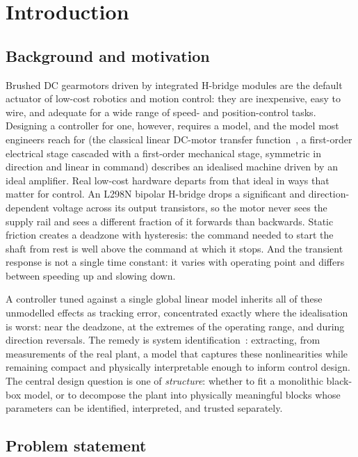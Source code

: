 \chapter{Introduction}
\label{chap:intro}

\section{Background and motivation}

Brushed DC gearmotors driven by integrated H-bridge modules are the default actuator of low-cost robotics and motion control: they are inexpensive, easy to wire, and adequate for a wide range of speed- and position-control tasks. Designing a controller for one, however, requires a model, and the model most engineers reach for (the classical linear DC-motor transfer function~\citep{franklin2019}, a first-order electrical stage cascaded with a first-order mechanical stage, symmetric in direction and linear in command) describes an idealised machine driven by an ideal amplifier. Real low-cost hardware departs from that ideal in ways that matter for control. An L298N bipolar H-bridge drops a significant and direction-dependent voltage across its output transistors, so the motor never sees the supply rail and sees a different fraction of it forwards than backwards. Static friction creates a deadzone with hysteresis: the command needed to start the shaft from rest is well above the command at which it stops. And the transient response is not a single time constant: it varies with operating point and differs between speeding up and slowing down.

A controller tuned against a single global linear model inherits all of these unmodelled effects as tracking error, concentrated exactly where the idealisation is worst: near the deadzone, at the extremes of the operating range, and during direction reversals. The remedy is system identification~\citep{ljung1999}: extracting, from measurements of the real plant, a model that captures these nonlinearities while remaining compact and physically interpretable enough to inform control design. The central design question is one of \emph{structure}: whether to fit a monolithic black-box model, or to decompose the plant into physically meaningful blocks whose parameters can be identified, interpreted, and trusted separately.

\section{Problem statement}

